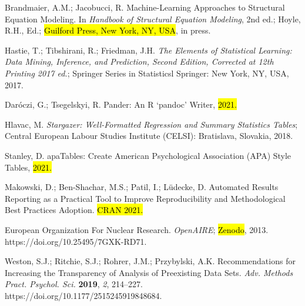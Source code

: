 \documentclass[psych,tutorial,accept,moreauthors,pdftex]{Definitions/mdpi}
\begin{document}
\begin{thebibliography}{999}
Brandmaier, A.M.; Jacobucci, R. Machine-Learning Approaches to Structural Equation Modeling. In \emph{Handbook of Structural Equation Modeling}, 2nd ed.; Hoyle, R.H., Ed.; \hl{Guilford Press, New York, NY, USA}, in press.


Hastie, T.; Tibshirani, R.; Friedman, J.H. \emph{The Elements of Statistical Learning: Data Mining, Inference, and Prediction, Second Edition, Corrected at 12th Printing 2017 ed.}; Springer Series in Statisticsl Springer: New York, NY, USA, 2017.


Daróczi, G.; Tsegelskyi, R. Pander: An R ‘pandoc’ Writer, \hl{2021.}%


Hlavac, M. \emph{Stargazer: Well-Formatted Regression and Summary Statistics Tables}; Central European Labour Studies Institute (CELSI): Bratislava, Slovakia, 2018.


Stanley, D. apaTables: Create American Psychological Association (APA) Style Tables, \hl{2021.}%

Makowski, D.; Ben-Shachar, M.S.; Patil, I.; Lüdecke, D. Automated Results Reporting as a Practical Tool to Improve Reproducibility and Methodological Best Practices Adoption. \hl{CRAN 2021.}%

European Organization For Nuclear Research. \emph{OpenAIRE}; \hl{Zenodo}, 2013. https://doi.org/10.25495/7GXK-RD71.%

Weston, S.J.; Ritchie, S.J.; Rohrer, J.M.; Przybylski, A.K. Recommendations for Increasing the Transparency of Analysis of Preexisting Data Sets. \emph{Adv. Methods Pract. Psychol. Sci.} \textbf{2019}, \emph{2}, 214--227. https://doi.org/10.1177/2515245919848684.



\end{thebibliography}
\end{document}
